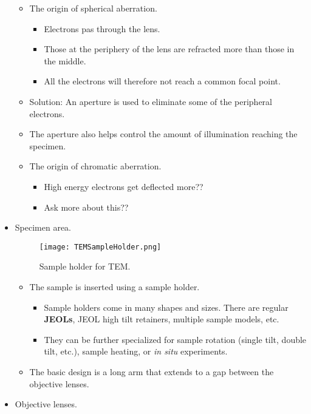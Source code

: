 \documentclass[../notes.tex]{subfiles}
\begin{document}
\begin{itemize}
\begin{itemize}
        \item The origin of spherical aberration.
        \begin{itemize}
            \item Electrons pas through the lens.
            \item Those at the periphery of the lens are refracted more than those in the middle.
            \item All the electrons will therefore not reach a common focal point.
        \end{itemize}
        \item Solution: An aperture is used to eliminate some of the peripheral electrons.
        \item The aperture also helps control the amount of illumination reaching the specimen.
        \item The origin of chromatic aberration.
        \begin{itemize}
            \item High energy electrons get deflected more??
            \item Ask more about this??
        \end{itemize}
    \end{itemize}
    \item Specimen area.
    \begin{figure}[h!]
        \centering
        \texttt{[image: TEMSampleHolder.png]}
        \caption{Sample holder for TEM.}
        \label{fig:TEMSampleHolder}
    \end{figure}
    \begin{itemize}
        \item The sample is inserted using a sample holder.
        \begin{itemize}
            \item Sample holders come in many shapes and sizes. There are regular \textbf{JEOLs}, JEOL high tilt retainers, multiple sample models, etc.
            \item They can be further specialized for sample rotation (single tilt, double tilt, etc.), sample heating, or \emph{in situ} experiments.
        \end{itemize}
        \item The basic design is a long arm that extends to a gap between the objective lenses.
    \end{itemize}
    \item Objective lenses.
    \begin{itemize}

\end{itemize}
\end{itemize}
\end{document}
